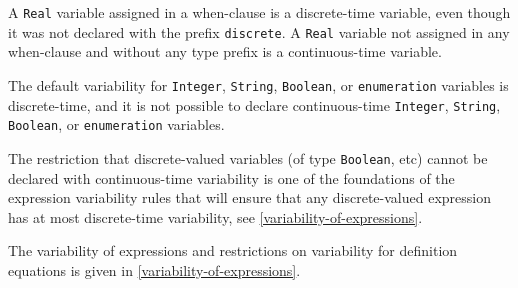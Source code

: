 A \lstinline!Real! variable assigned in a when-clause is a discrete-time variable,
even though it was not declared with the prefix \lstinline!discrete!. A \lstinline!Real!
variable not assigned in any when-clause and without any type prefix is
a continuous-time variable.

The default variability for \lstinline!Integer!, \lstinline!String!,
\lstinline!Boolean!, or \lstinline!enumeration!
variables is discrete-time, and it is not possible to declare
continuous-time \lstinline!Integer!, \lstinline!String!, \lstinline!Boolean!, or
\lstinline!enumeration! variables.

\begin{nonnormative}
The restriction that discrete-valued variables (of type \lstinline!Boolean!, etc) cannot be
declared with continuous-time variability is one of the foundations of the expression variability rules
that will ensure that any discrete-valued expression has at most discrete-time variability, see \cref{variability-of-expressions}.
\end{nonnormative}

The variability of expressions and restrictions on variability for
definition equations is given in \cref{variability-of-expressions}.

